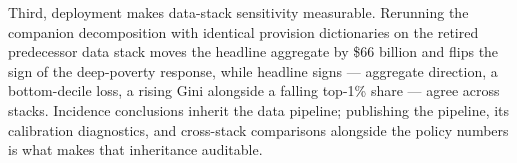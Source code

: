 Third, deployment makes data-stack sensitivity measurable.
Rerunning the companion decomposition with identical provision
dictionaries on the retired predecessor data stack moves the headline
aggregate by \$66 billion and flips the sign of the deep-poverty
response, while headline signs --- aggregate direction, a
bottom-decile loss, a rising Gini alongside a falling top-1\% share
--- agree across stacks. Incidence conclusions inherit the data
pipeline; publishing the pipeline, its calibration diagnostics, and
cross-stack comparisons alongside the policy numbers is what makes
that inheritance auditable.
